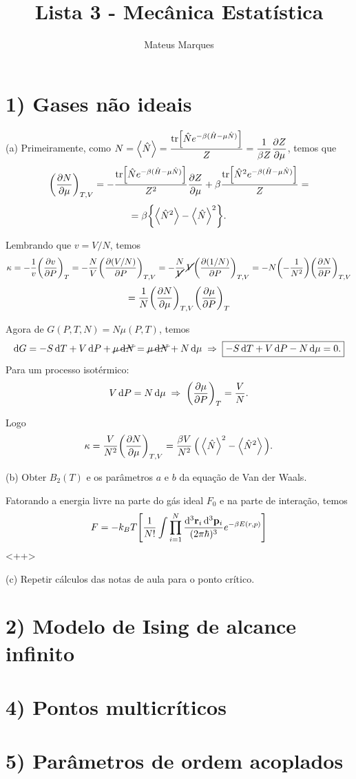 \documentclass[a4paper,10pt]{article}
\title{\Huge{\textbf{Lista 3 - Mecânica Estatística}}}
\author{Mateus Marques}
\begin{document}
\maketitle

\section*{1) Gases não ideais}

(a) Primeiramente, como $\displaystyle{N = \ev{\hat{N}} = \frac{\tr[\hat{N} e^{-\beta(\hat{H} - \mu \hat{N})}]}{Z} = \frac{1}{\beta Z} \pdv{Z}{\mu}}$, temos que
$$
\qty(\pdv{N}{\mu})_{T,V} = - \frac{\tr[\hat{N} e^{-\beta(\hat{H} - \mu \hat{N})}]}{Z^2} \pdv{Z}{\mu} +
\beta \frac{\tr[\hat{N}^2 e^{-\beta(\hat{H} - \mu \hat{N})}]}{Z} =
$$
$$
= \beta \qty{ \ev{\hat{N}^2} - \ev{\hat{N}}^2 }.
$$


Lembrando que $v = V/N$, temos
$$
\kappa = - \frac{1}{v} \qty(\pdv{v}{P})_{T} = - \frac{N}{V} \qty(\pdv{(V/N)}{P})_{T,V} =
- \frac{N}{\cancel{V}} \, \cancel{V} \qty(\pdv{(1/N)}{P})_{T, V} = -N \qty(-\frac{1}{N^2}) \qty(\pdv{N}{P})_{T,V}
$$
$$
= \frac{1}{N} \qty(\pdv{N}{\mu})_{T,V} \qty(\pdv{\mu}{P})_{T}
$$

Agora de $G(P,T,N) = N \mu(P,T)$, temos
$$
\dd{G} = -S \dd{T} + V \dd{P} + \cancel{\mu \dd{N}} = \cancel{\mu \dd{N}} + N \dd{\mu} \; \Rightarrow \;
\boxed{ -S \dd{T} + V \dd{P} - N \dd{\mu} = 0. }
$$
Para um processo isotérmico:
$$
V \dd{P} = N \dd{\mu} \; \Rightarrow \; \qty(\pdv{\mu}{P})_{T} = \frac{V}{N}.
$$

Logo
$$
\kappa = \frac{V}{N^2} \pdvc{N}{\mu}{T,V} = \frac{\beta V}{N^2} \, \Big(\ev{\hat{N}}^2 - \ev{\hat{N}^2}\Big).
$$

\n\n\n

(b) Obter $B_2(T)$ e os parâmetros $a$ e $b$ da equação de Van der Waals.

Fatorando a energia livre na parte do gás ideal $F_0$ e na parte de interação, temos
$$
F = - k_B T \qty[
\frac{1}{N!} \int \prod_{i=1}^N \frac{\dd[3]{\vb{r}_i} \dd[3]{\vb{p}_i}}{(2\pi \hbar)^3} e^{-\beta E(r,p)}
]
$$
<++>


(c) Repetir cálculos das notas de aula para o ponto crítico.


\pagebreak

\section*{2) Modelo de Ising de alcance infinito}



\pagebreak

\section*{4) Pontos multicríticos}



\pagebreak

\section*{5) Parâmetros de ordem acoplados}

%


\end{document}
